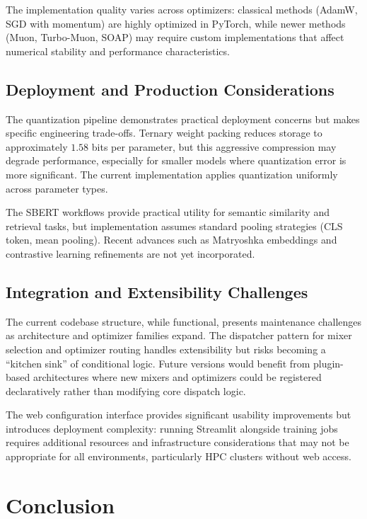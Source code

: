 \documentclass[11pt,a4paper]{article}
\begin{document}
The implementation quality varies across optimizers: classical methods (AdamW, SGD with momentum) are highly optimized in PyTorch, while newer methods (Muon, Turbo-Muon, SOAP) may require custom implementations that affect numerical stability and performance characteristics.

\subsection{Deployment and Production Considerations}

The quantization pipeline demonstrates practical deployment concerns but makes specific engineering trade-offs. Ternary weight packing reduces storage to approximately $1.58$ bits per parameter, but this aggressive compression may degrade performance, especially for smaller models where quantization error is more significant. The current implementation applies quantization uniformly across parameter types.

The SBERT workflows provide practical utility for semantic similarity and retrieval tasks, but implementation assumes standard pooling strategies (CLS token, mean pooling). Recent advances such as Matryoshka embeddings \citep{muennighoff_matryoshka_2021} and contrastive learning refinements \citep{chen_supervised_2020} are not yet incorporated.

\subsection{Integration and Extensibility Challenges}

The current codebase structure, while functional, presents maintenance challenges as architecture and optimizer families expand. The dispatcher pattern for mixer selection and optimizer routing handles extensibility but risks becoming a ``kitchen sink'' of conditional logic. Future versions would benefit from plugin-based architectures where new mixers and optimizers could be registered declaratively rather than modifying core dispatch logic.

The web configuration interface provides significant usability improvements but introduces deployment complexity: running Streamlit alongside training jobs requires additional resources and infrastructure considerations that may not be appropriate for all environments, particularly HPC clusters without web access.

\section{Conclusion}
\label{sec:conclusion}
\end{document}
